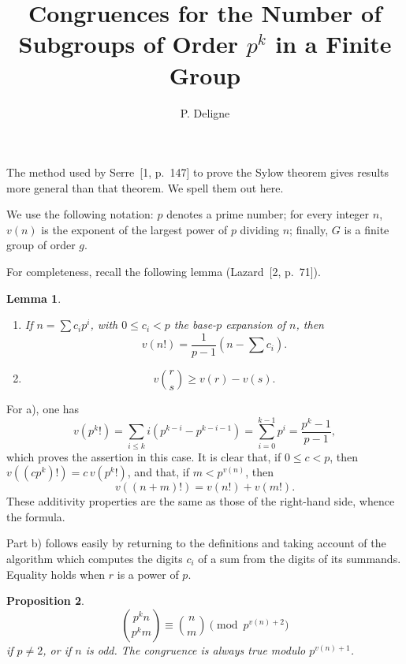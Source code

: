 \documentclass[12pt]{amsart}
\title{Congruences for the Number of Subgroups of Order $p^k$ in a Finite Group}
\author{P. Deligne}
\date{}
\theoremstyle{plain}
\newtheorem{lemma}{Lemma}
\newtheorem{proposition}[lemma]{Proposition}
\begin{document}
\maketitle
\thispagestyle{empty}

The method used by Serre~[1, p.~147] to prove the Sylow theorem gives results more general than that theorem. We spell them out here.

We use the following notation: $p$ denotes a prime number; for every integer $n$, $v(n)$ is the exponent of the largest power of $p$ dividing $n$; finally, $G$ is a finite group of order $g$.

For completeness, recall the following lemma (Lazard~[2, p.~71]).

\begin{lemma}\ \par
\begin{enumerate}
\item[a)] If $n = \sum c_i p^i$, with $0 \leq c_i < p$ the base-$p$ expansion of $n$, then
\[
v(n!) = \frac{1}{p-1}\left(n - \sum c_i\right).
\]
\item[b)]
\[
v\binom{r}{s} \geq v(r)-v(s).
\]
\end{enumerate}
\end{lemma}

For a), one has
\[
v(p^k!)=\sum_{i\leq k} i(p^{k-i}-p^{k-i-1})=\sum_{i=0}^{k-1}p^i=\frac{p^k-1}{p-1},
\]
which proves the assertion in this case. It is clear that, if $0\leq c<p$, then $v((cp^k)!)=c\,v(p^k!)$, and that, if $m<p^{v(n)}$, then
\[
v((n+m)!)=v(n!)+v(m!).
\]
These additivity properties are the same as those of the right-hand side, whence the formula.

Part b) follows easily by returning to the definitions and taking account of the algorithm which computes the digits $c_i$ of a sum from the digits of its summands. Equality holds when $r$ is a power of $p$.

\begin{proposition}
\[
\binom{p^k n}{p^k m}\equiv \binom{n}{m}\pmod {p^{v(n)+2}}
\]
if $p\neq 2$, or if $n$ is odd. The congruence is always true modulo $p^{v(n)+1}$.
\end{proposition}
\end{document}
